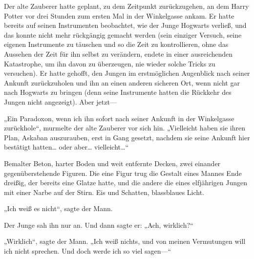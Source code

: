 Der alte Zauberer hatte geplant, zu dem Zeitpunkt zurückzugehen, an dem Harry Potter vor drei Stunden zum ersten Mal in der Winkelgasse ankam. Er hatte bereits auf seinen Instrumenten beobachtet, wie der Junge Hogwarts verließ, und das konnte nicht mehr rückgängig gemacht werden (sein einziger Versuch, seine eigenen Instrumente zu täuschen und so die Zeit zu kontrollieren, ohne das Aussehen der Zeit für ihn selbst zu verändern, endete in einer ausreichenden Katastrophe, um ihn davon zu überzeugen, nie wieder solche Tricks zu versuchen). Er hatte gehofft, den Jungen im erstmöglichen Augenblick nach seiner Ankunft zurückzuholen und ihn an einen anderen sicheren Ort, wenn nicht gar nach Hogwarts zu bringen (denn seine Instrumente hatten die Rückkehr des Jungen nicht angezeigt). Aber jetzt—

„Ein Paradoxon, wenn ich ihn sofort nach seiner Ankunft in der Winkelgasse zurückhole“, murmelte der alte Zauberer vor sich hin. „Vielleicht haben sie ihren Plan, Askaban auszurauben, erst in Gang gesetzt, nachdem sie seine Ankunft hier bestätigt hatten… oder aber… vielleicht…“

\later

Bemalter Beton, harter Boden und weit entfernte Decken, zwei einander gegenüberstehende Figuren. Die eine Figur trug die Gestalt eines Mannes Ende dreißig, der bereits eine Glatze hatte, und die andere die eines elfjährigen Jungen mit einer Narbe auf der Stirn. Eis und Schatten, blassblaues Licht.

„Ich weiß es nicht“, sagte der Mann.

Der Junge sah ihn nur an. Und dann sagte er: „Ach, wirklich?“

„Wirklich“, sagte der Mann. „Ich weiß nichts, und von meinen Vermutungen will ich nicht sprechen. Und doch werde ich so viel sagen—“

